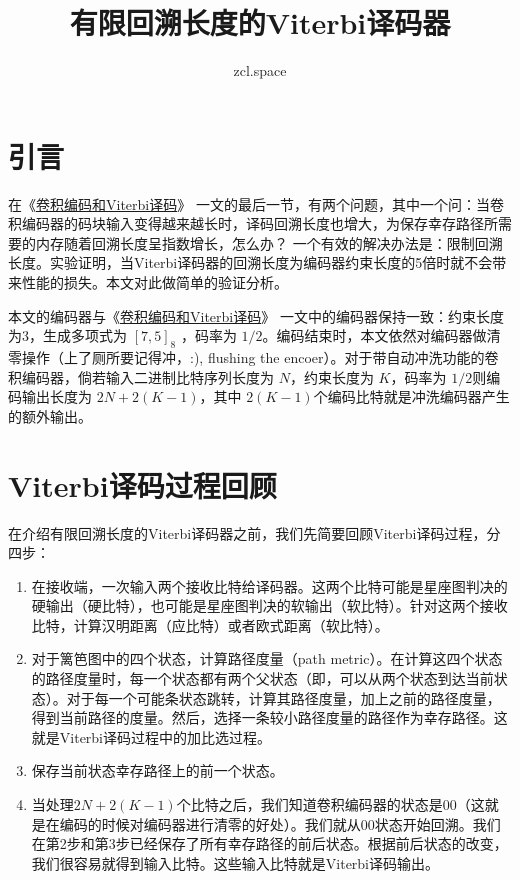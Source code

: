 \documentclass[10pt,a4paper,UTF8]{article}
\author{zcl.space}
\date{}
\title{有限回溯长度的Viterbi译码器}
\begin{document}
\maketitle
\tableofcontents


\section{引言}
\label{sec:orgheadline1}


在《\href{ECCviterbi.org}{卷积编码和Viterbi译码}》 一文的最后一节，有两个问题，其中一个问：当卷积编码器的码块输入变得越来越长时，译码回溯长度也增大，为保存幸存路径所需要的内存随着回溯长度呈指数增长，怎么办？ 一个有效的解决办法是：限制回溯长度。实验证明，当Viterbi译码器的回溯长度为编码器约束长度的5倍时就不会带来性能的损失。本文对此做简单的验证分析。

本文的编码器与《\href{ECCviterbi.org}{卷积编码和Viterbi译码}》 一文中的编码器保持一致：约束长度为3，生成多项式为 \([7,5]_{8}\) ，码率为 \(1/2\)。编码结束时，本文依然对编码器做清零操作（上了厕所要记得冲，:), flushing the encoer）。对于带自动冲洗功能的卷积编码器，倘若输入二进制比特序列长度为 \(N\)，约束长度为 \(K\)，码率为 \(1/2\)则编码输出长度为 \(2N+ 2(K-1)\)，其中 \(2(K-1)\)个编码比特就是冲洗编码器产生的额外输出。
\section{Viterbi译码过程回顾}
\label{sec:orgheadline2}


在介绍有限回溯长度的Viterbi译码器之前，我们先简要回顾Viterbi译码过程，分四步：

\begin{enumerate}
\item 在接收端，一次输入两个接收比特给译码器。这两个比特可能是星座图判决的硬输出（硬比特），也可能是星座图判决的软输出（软比特）。针对这两个接收比特，计算汉明距离（应比特）或者欧式距离（软比特）。
\item 对于篱笆图中的四个状态，计算路径度量（path metric）。在计算这四个状态的路径度量时，每一个状态都有两个父状态（即，可以从两个状态到达当前状态）。对于每一个可能条状态跳转，计算其路径度量，加上之前的路径度量，得到当前路径的度量。然后，选择一条较小路径度量的路径作为幸存路径。这就是Viterbi译码过程中的加比选过程。
\item 保存当前状态幸存路径上的前一个状态。
\item 当处理\(2N+ 2(K-1)\)个比特之后，我们知道卷积编码器的状态是00（这就是在编码的时候对编码器进行清零的好处）。我们就从00状态开始回溯。我们在第2步和第3步已经保存了所有幸存路径的前后状态。根据前后状态的改变，我们很容易就得到输入比特。这些输入比特就是Viterbi译码输出。
\end{enumerate}
\end{document}
